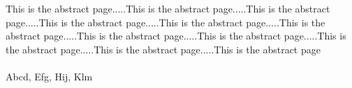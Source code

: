 \clearpage
{}
{}
\chapter*{{\fontsize{14pt}{16.8pt}}}

\vspace{-2em}
\fontsize{12pt}{14.4pt}\selectfont 

This is the abstract page.....This is the abstract page.....This is the abstract page.....This is the abstract page.....This is the abstract page.....This is the abstract page.....This is the abstract page.....This is the abstract page.....This is the abstract page.....This is the abstract page.....This is the abstract page\\

\lipsum[1] \\


 Abcd, Efg, Hij, Klm 


\vfill
\newpage

